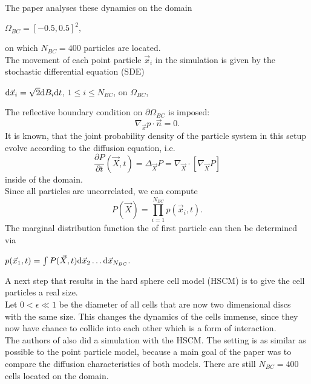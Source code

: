 The paper\cite{Bruna2012} analyses these dynamics on the domain 
\begin{center}
    $
    \Omega_{BC} = [-0.5, 0.5]^2,
    $
\end{center}
on which $N_{BC} = 400$ particles are located. \\
The movement of each point particle $\vec{x}_i$ in the simulation is given by the stochastic differential equation (SDE)
\begin{center}
    $\mathrm{d} \vec{x}_i = \sqrt{2} \mathrm{d} B_i \mathrm{d} t$, \hspace{0.5em}
    $1 \leq i \leq N_{BC}$,\hspace{0.5em}
    on $ \Omega_{BC}$, \\
\end{center}
The reflective boundary condition on $\partial \Omega_{BC}$ is imposed:
\begin{equation}
    \nabla_{\vec{x}} p \cdot \vec{n} = 0.
\end{equation}
It is known, that the joint probability density of the particle system in this setup evolve according to the diffusion equation, i.e.
\begin{equation}
    \frac{\partial P}{\partial t}(\vec{X}, t) = \Delta_{\vec{X}} P = \nabla_{\vec{X}} \cdot [ \nabla_{\vec{X}} P]
    \label{eq:heat}
\end{equation}
inside of the domain. \\
Since all particles are uncorrelated, we can compute
\begin{equation}
    P(\vec{X}) = \prod_{i=1}^{N_{BC}} p(\vec{x}_i, t).
\end{equation}
The marginal distribution function the of first particle can then be determined via
\begin{center}
    $
    p(\vec{x}_1, t) = \int P(\vec{X}, t) \mathrm{d} \vec{x}_2 \dots  \mathrm{d} \vec{x}_{N_{BC}}.
    $
\end{center} 

A next step that results in the hard sphere cell model (HSCM) is to give the cell particles a real size. \\
Let $0 < \epsilon \ll 1$ be the diameter of all cells that are now two dimensional discs with the same size. 
This changes the dynamics of the cells immense, since they now have chance to collide into each other which is a form of interaction. \\
The authors of \cite{Bruna2012} also did a simulation with the HSCM. 
The setting is as similar as possible to the point particle model, because a main goal of the paper was to compare the diffusion characteristics of both models. 
There are still $N_{BC} = 400$ cells located on the domain. \\

